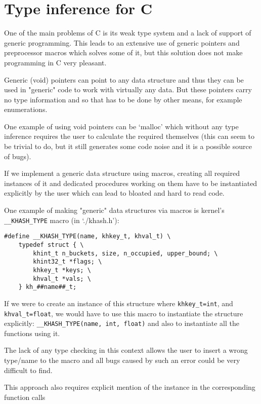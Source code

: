 \chapter{Type inference for C}

One of the main problems of C is its weak type system and a lack of support of generic programming.
This leads to an extensive use of generic pointers and preprocessor macros which solves some of it,
but this solution does not make programming in C very pleasant. %

Generic (void) pointers can point to any data structure and thus they can be used in "generic" code
to work with virtually any data. But these pointers carry no type information and so that has to be
done by other means, for example enumerations.

One example of using void pointers can be `malloc' which without any type inference requires the user
to calculate the required themselves (this can seem to be trivial to do, but it still generates some code
noise and it is a possible source of bugs).

If we implement a generic data structure using macros, creating all required instances of
it and dedicated procedures working on them have to be instantiated explicitly by the user
which can lead to bloated and hard to read code.

One example of making "generic" data structures via macros is kernel's \lstinline{__KHASH_TYPE} macro (in `./khash.h'):

\begin{lstlisting}
#define __KHASH_TYPE(name, khkey_t, khval_t) \
	typedef struct { \
		khint_t n_buckets, size, n_occupied, upper_bound; \
		khint32_t *flags; \
		khkey_t *keys; \
		khval_t *vals; \
	} kh_##name##_t;
\end{lstlisting}

If we were to create an instance of this structure where \lstinline{khkey_t=int}, and \lstinline{khval_t=float},
we would have to use this macro to instantiate the structure explicitly:
\lstinline{__KHASH_TYPE(name, int, float)} and also to instantiate all the functions using it.

The lack of any type checking in this context allows the user to insert a wrong type/name to the macro
and all bugs caused by such an error could be very difficult to find.

This approach also requires explicit mention of the instance in the corresponding function calls

